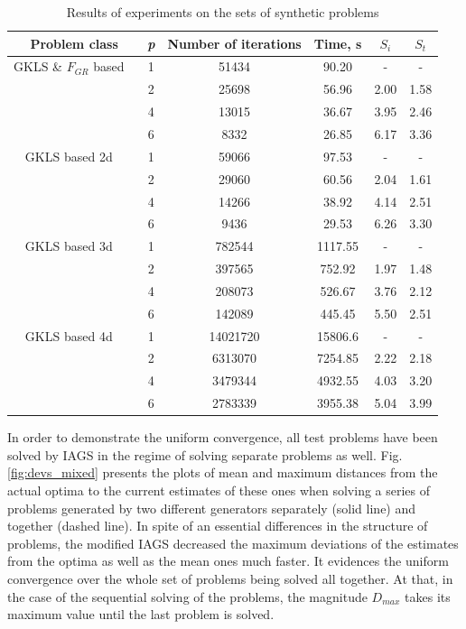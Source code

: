 \documentclass[runningheads]{llncs}
\begin{document}
\begin{table}
  \centering
  \caption{Results of experiments on the sets of synthetic problems}
  \label{tab:speedup}
  \begin{tabular}{c|c|cccc}
    Problem class & \textit{p} & Number of iterations & Time, s & \(S_i\) & \(S_t\)   \\
    \hline
    GKLS \& \(F_{GR}\) based \
      & 1 & 51434 & 90.20 & -    & - \\
      & 2 & 25698 & 56.96 & 2.00 & 1.58 \\
      & 4 & 13015 & 36.67 & 3.95 & 2.46 \\
      & 6 & 8332  & 26.85 & 6.17 & 3.36 \\
    \hline
    GKLS based 2d \
      & 1 & 59066 & 97.53 & -    & - \\
      & 2 & 29060 & 60.56 & 2.04 & 1.61 \\
      & 4 & 14266 & 38.92 & 4.14 & 2.51 \\
      & 6 & 9436  & 29.53 & 6.26 & 3.30 \\
    \hline
    GKLS based 3d \
      & 1 & 782544 & 1117.55 & -    & - \\
      & 2 & 397565 & 752.92  & 1.97 & 1.48 \\
      & 4 & 208073 & 526.67  & 3.76 & 2.12 \\
      & 6 & 142089 & 445.45  & 5.50 & 2.51 \\
    \hline
    GKLS based 4d \
      & 1 & 14021720 & 15806.6 & -    & - \\
      & 2 & 6313070 & 7254.85  & 2.22 & 2.18 \\
      & 4 & 3479344 & 4932.55  & 4.03 & 3.20 \\
      & 6 & 2783339 & 3955.38  & 5.04 & 3.99 \\
    \hline
  \end{tabular}
\end{table}

In order to demonstrate the uniform convergence, all test problems have been solved by IAGS
in the regime of solving separate problems as well.
Fig. \ref{fig:devs_mixed} presents the plots of mean and maximum distances from the actual
optima to the current estimates of these ones when solving a series of problems generated by
two different generators separately (solid line) and together (dashed line).
In spite of an essential differences in the structure of problems, the modified IAGS decreased
the maximum deviations of the estimates from the optima as well as the mean ones much faster.
It evidences the uniform convergence over the whole set of problems being solved all together.
At that, in the case of the sequential solving of the problems, the magnitude \(D_{max}\) takes
its maximum value until the last problem is solved.
\end{document}
